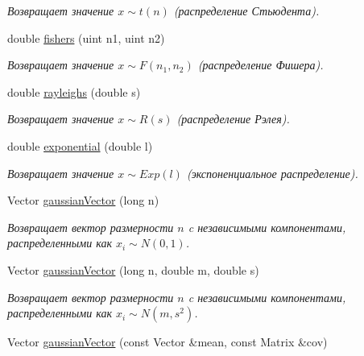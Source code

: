 \begin{DoxyCompactItemize}
\begin{DoxyCompactList}\small\item\em Возвращает значение $ x \sim t(n)$ (распределение Стьюдента). \end{DoxyCompactList}\item 
\hypertarget{namespace_math_1_1_rand_a98f49933c521884e649e999b6a3c9fb6}{}\label{namespace_math_1_1_rand_a98f49933c521884e649e999b6a3c9fb6} 
double \hyperlink{namespace_math_1_1_rand_a98f49933c521884e649e999b6a3c9fb6}{fishers} (uint n1, uint n2)
\begin{DoxyCompactList}\small\item\em Возвращает значение $ x \sim F(n_1,n_2)$ (распределение Фишера). \end{DoxyCompactList}\item 
\hypertarget{namespace_math_1_1_rand_a412ad37c8ba56a33e8d4687df37c9442}{}\label{namespace_math_1_1_rand_a412ad37c8ba56a33e8d4687df37c9442} 
double \hyperlink{namespace_math_1_1_rand_a412ad37c8ba56a33e8d4687df37c9442}{rayleighs} (double s)
\begin{DoxyCompactList}\small\item\em Возвращает значение $ x \sim R(s)$ (распределение Рэлея). \end{DoxyCompactList}\item 
\hypertarget{namespace_math_1_1_rand_ae6019c3dc46b97c95fa29083f191dcf8}{}\label{namespace_math_1_1_rand_ae6019c3dc46b97c95fa29083f191dcf8} 
double \hyperlink{namespace_math_1_1_rand_ae6019c3dc46b97c95fa29083f191dcf8}{exponential} (double l)
\begin{DoxyCompactList}\small\item\em Возвращает значение $ x \sim Exp(l)$ (экспоненциальное распределение). \end{DoxyCompactList}\item 
\hypertarget{namespace_math_1_1_rand_a431a3d55f304ba341c9583bca0848f26}{}\label{namespace_math_1_1_rand_a431a3d55f304ba341c9583bca0848f26} 
Vector \hyperlink{namespace_math_1_1_rand_a431a3d55f304ba341c9583bca0848f26}{gaussian\+Vector} (long n)
\begin{DoxyCompactList}\small\item\em Возвращает вектор размерности $n$ c независимыми компонентами, распределенными как $x_i \sim N(0,1)$. \end{DoxyCompactList}\item 
\hypertarget{namespace_math_1_1_rand_a615d58fe0cc83a62f4c74376d4a47d61}{}\label{namespace_math_1_1_rand_a615d58fe0cc83a62f4c74376d4a47d61} 
Vector \hyperlink{namespace_math_1_1_rand_a615d58fe0cc83a62f4c74376d4a47d61}{gaussian\+Vector} (long n, double m, double s)
\begin{DoxyCompactList}\small\item\em Возвращает вектор размерности $n$ c независимыми компонентами, распределенными как $x_i \sim N(m,s^2)$. \end{DoxyCompactList}\item 
Vector \hyperlink{namespace_math_1_1_rand_a9508f6778a02ce0f0be669cb32e25dc6}{gaussian\+Vector} (const Vector \&mean, const Matrix \&cov)
\end{DoxyCompactItemize}


